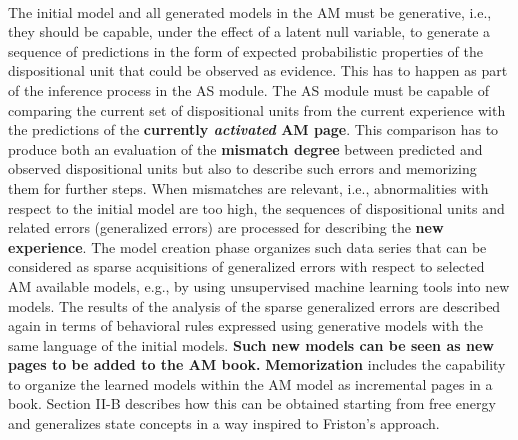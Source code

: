 \documentclass{article}
\begin{document}
		\paragraph{}The initial model and all generated models in the AM
		must be generative, i.e., they should be capable, under the
		effect of a latent null variable, to generate a sequence of
		predictions in the form of expected probabilistic properties
		of the dispositional unit that could be observed as evidence.
		This has to happen as part of the inference process in the AS
		module. The AS module must be capable of comparing the
		current set of dispositional units from the current experience
		with the predictions of the \textbf{currently \emph{activated} AM page}. This
		comparison has to produce both an evaluation of the \textbf{mismatch
		degree} between predicted and observed dispositional units but
		also to describe such errors and memorizing them for further
		steps. When mismatches are relevant, i.e., abnormalities with
		respect to the initial model are too high, the sequences of
		dispositional units and related errors (generalized errors) are
		processed for describing the \textbf{new experience}. The model creation phase organizes such data series that can be considered
		as sparse acquisitions of generalized errors with respect to
		selected AM available models, e.g., by using unsupervised
		machine learning tools into new models. The results of the
		analysis of the sparse generalized errors are described again
		in terms of behavioral rules expressed using generative models
		with the same language of the initial models. \textbf{Such new models
		can be seen as new pages to be added to the AM book.}
		\textbf{Memorization} includes the capability to organize the learned
		models within the AM model as incremental pages in a book.
		\citet{regazzoni-2020-multi-sensorial-generative-and-descriptive-self-awareness-models-for-autonomous-systems} Section II-B describes how this can be obtained starting from
		free energy and generalizes state concepts in a way inspired
		to Friston’s approach.
\end{document}
